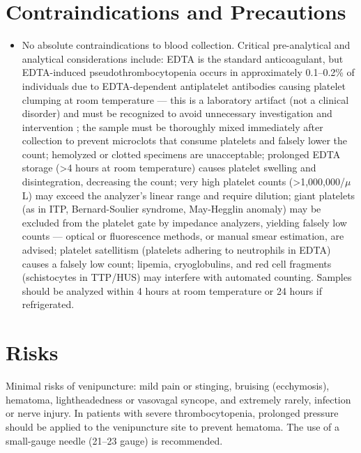 \section*{Contraindications and Precautions}
\begin{itemize}
  \item No absolute contraindications to blood collection. Critical pre-analytical and analytical considerations include: EDTA is the standard anticoagulant, but EDTA-induced pseudothrombocytopenia occurs in approximately 0.1--0.2\% of individuals due to EDTA-dependent antiplatelet antibodies causing platelet clumping at room temperature --- this is a laboratory artifact (not a clinical disorder) and must be recognized to avoid unnecessary investigation and intervention \cite{wallach2022interpretation}; the sample must be thoroughly mixed immediately after collection to prevent microclots that consume platelets and falsely lower the count; hemolyzed or clotted specimens are unacceptable; prolonged EDTA storage (>4 hours at room temperature) causes platelet swelling and disintegration, decreasing the count; very high platelet counts (>1,000,000/$\mu$L) may exceed the analyzer's linear range and require dilution; giant platelets (as in ITP, Bernard-Soulier syndrome, May-Hegglin anomaly) may be excluded from the platelet gate by impedance analyzers, yielding falsely low counts --- optical or fluorescence methods, or manual smear estimation, are advised; platelet satellitism (platelets adhering to neutrophils in EDTA) causes a falsely low count; lipemia, cryoglobulins, and red cell fragments (schistocytes in TTP/HUS) may interfere with automated counting. Samples should be analyzed within 4 hours at room temperature or 24 hours if refrigerated.
\end{itemize}
\section*{Risks}
Minimal risks of venipuncture: mild pain or stinging, bruising (ecchymosis), hematoma, lightheadedness or vasovagal syncope, and extremely rarely, infection or nerve injury. In patients with severe thrombocytopenia, prolonged pressure should be applied to the venipuncture site to prevent hematoma. The use of a small-gauge needle (21--23 gauge) is recommended.

